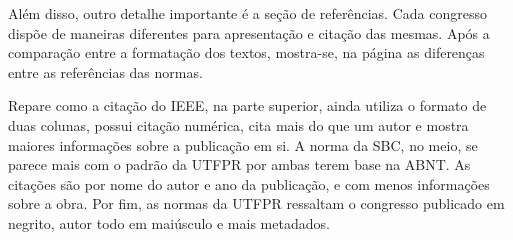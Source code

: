 

Além disso, outro detalhe importante é a seção de referências. Cada congresso dispõe de maneiras diferentes para apresentação e citação das mesmas. Após a comparação entre a formatação dos textos, mostra-se, na página \pageref{referencias} as diferenças entre as referências das normas.

Repare como a citação do IEEE, na parte superior, ainda utiliza o formato de duas colunas, possui citação numérica, cita mais do que um autor e mostra maiores informações sobre a publicação em si. A norma da SBC, no meio, se parece mais com o padrão da UTFPR por ambas terem base na ABNT. As citações são por nome do autor e ano da publicação, e com menos informações sobre a obra. Por fim, as normas da UTFPR ressaltam o congresso publicado em negrito, autor todo em maiúsculo e mais metadados.

